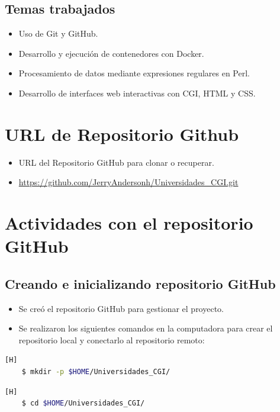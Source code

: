 \documentclass{article}
\begin{document}
    \subsection*{Temas trabajados}
    \begin{itemize}
        \item Uso de Git y GitHub.
        \item Desarrollo y ejecución de contenedores con Docker.
        \item Procesamiento de datos mediante expresiones regulares en Perl.
        \item Desarrollo de interfaces web interactivas con CGI, HTML y CSS.
    \end{itemize}


	\section{URL de Repositorio Github}
	\begin{itemize}
		\item URL del Repositorio GitHub para clonar o recuperar.
		\item \url{https://github.com/JerryAndersonh/Universidades_CGI.git}
	\end{itemize}
	
    \section{Actividades con el repositorio GitHub}
    
    \subsection{Creando e inicializando repositorio GitHub} 
    \begin{itemize} 
        \item Se creó el repositorio GitHub para gestionar el proyecto. 
        \item Se realizaron los siguientes comandos en la computadora para crear el repositorio local y conectarlo al repositorio remoto:
    \end{itemize}
    
    \begin{lstlisting}[language=bash,caption={Creando directorio de trabajo}][H]
    $ mkdir -p $HOME/Universidades_CGI/
    \end{lstlisting}
    
    \begin{lstlisting}[language=bash,caption={Dirigiéndonos al directorio de trabajo}][H]
    $ cd $HOME/Universidades_CGI/
    \end{lstlisting}
    
\end{document}
